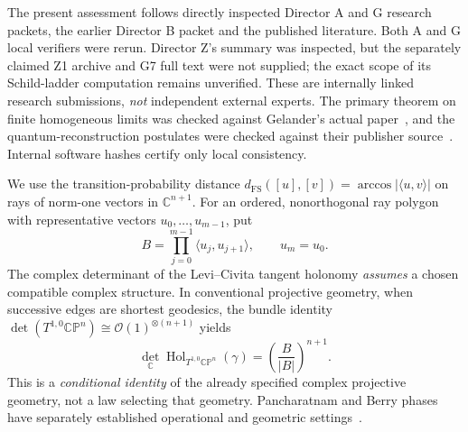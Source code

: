 \documentclass[11pt,a4paper]{article}
\newcommand{\CP}{\mathbb{CP}}
\newcommand{\Hol}{\operatorname{Hol}}
\newcommand{\FS}{\mathrm{FS}}
\begin{document}
The present assessment follows directly inspected Director A and G research packets, the earlier Director B packet and the published literature. Both A and G local verifiers were rerun. Director Z's summary was inspected, but the separately claimed Z1 archive and G7 full text were not supplied; the exact scope of its Schild-ladder computation remains unverified. These are internally linked research submissions, \emph{not} independent external experts. The primary theorem on finite homogeneous limits was checked against Gelander's actual paper~\cite{gelander}, and the quantum-reconstruction postulates were checked against their publisher source~\cite{barnum}. Internal software hashes certify only local consistency.

We use the transition-probability distance $d_{\FS}([u],[v])=\arccos|\langle u,v\rangle|$ on rays of norm-one vectors in $\mathbb C^{n+1}$. For an ordered, nonorthogonal ray polygon with representative vectors $u_0,\ldots,u_{m-1}$, put
\begin{equation}\label{eq:B}
B=\prod_{j=0}^{m-1}\langle u_j,u_{j+1}\rangle,\qquad u_m=u_0.
\end{equation}
The complex determinant of the Levi--Civita tangent holonomy \emph{assumes} a chosen compatible complex structure. In conventional projective geometry, when successive edges are shortest geodesics, the bundle identity $\det(T^{1,0}\CP^n)\cong\mathcal O(1)^{\otimes(n+1)}$ yields
\begin{equation}\label{eq:hol}
\det_{\mathbb C}\Hol_{T^{1,0}\CP^n}(\gamma)=\left(\frac B{|B|}\right)^{n+1}.
\end{equation}
This is a \emph{conditional identity} of the already specified complex projective geometry, not a law selecting that geometry. Pancharatnam and Berry phases have separately established operational and geometric settings~\cite{berryreview,li2026}.
\end{document}
